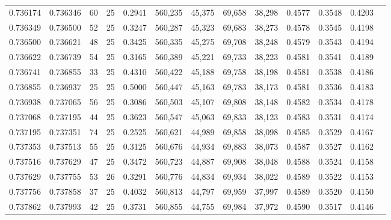 \begin{tabular}{rrrrrrrrrrrrr}
0.736174 & 0.736346 &    60 &  25 &                                     0.2941 & 560,235 &  45,375 &  69,658 &  38,298 & 0.4577 & 0.3548 & 0.4203 \\
0.736349 & 0.736500 &    52 &  25 &                                     0.3247 & 560,287 &  45,323 &  69,683 &  38,273 & 0.4578 & 0.3545 & 0.4198 \\
0.736500 & 0.736621 &    48 &  25 &                                     0.3425 & 560,335 &  45,275 &  69,708 &  38,248 & 0.4579 & 0.3543 & 0.4194 \\
0.736622 & 0.736739 &    54 &  25 &                                     0.3165 & 560,389 &  45,221 &  69,733 &  38,223 & 0.4581 & 0.3541 & 0.4189 \\
0.736741 & 0.736855 &    33 &  25 &                                     0.4310 & 560,422 &  45,188 &  69,758 &  38,198 & 0.4581 & 0.3538 & 0.4186 \\
0.736855 & 0.736937 &    25 &  25 &                                     0.5000 & 560,447 &  45,163 &  69,783 &  38,173 & 0.4581 & 0.3536 & 0.4183 \\
0.736938 & 0.737065 &    56 &  25 &                                     0.3086 & 560,503 &  45,107 &  69,808 &  38,148 & 0.4582 & 0.3534 & 0.4178 \\
0.737068 & 0.737195 &    44 &  25 &                                     0.3623 & 560,547 &  45,063 &  69,833 &  38,123 & 0.4583 & 0.3531 & 0.4174 \\
0.737195 & 0.737351 &    74 &  25 &                                     0.2525 & 560,621 &  44,989 &  69,858 &  38,098 & 0.4585 & 0.3529 & 0.4167 \\
0.737353 & 0.737513 &    55 &  25 &                                     0.3125 & 560,676 &  44,934 &  69,883 &  38,073 & 0.4587 & 0.3527 & 0.4162 \\
0.737516 & 0.737629 &    47 &  25 &                                     0.3472 & 560,723 &  44,887 &  69,908 &  38,048 & 0.4588 & 0.3524 & 0.4158 \\
0.737629 & 0.737755 &    53 &  26 &                                     0.3291 & 560,776 &  44,834 &  69,934 &  38,022 & 0.4589 & 0.3522 & 0.4153 \\
0.737756 & 0.737858 &    37 &  25 &                                     0.4032 & 560,813 &  44,797 &  69,959 &  37,997 & 0.4589 & 0.3520 & 0.4150 \\
0.737862 & 0.737993 &    42 &  25 &                                     0.3731 & 560,855 &  44,755 &  69,984 &  37,972 & 0.4590 & 0.3517 & 0.4146 \\

\end{tabular}
